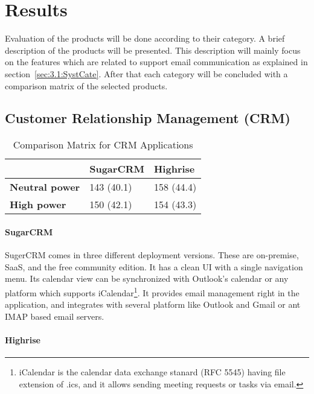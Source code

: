 \section{Results}
\label{sec:3.3:Resul}
Evaluation of the products will be done according to their category. A brief description of the products will be presented. This description will mainly focus on the features which are related to support email communication as explained in section~\ref{sec:3.1:SystCate}. After that each category will be concluded with a comparison matrix of the selected products.

\subsection{Customer Relationship Management (CRM)}
\label{subsec:3.3.1:Cust}

\begin{table}[!ht]
\begin{center}
	\caption[Comparison Matrix for CRM Applications]{Comparison Matrix for CRM Applications} \label{tab:comp_matr_crm}
    \begin{tabular}{ p{3cm} p{3cm}  p{3cm} }
	\hline
	& \textbf{SugarCRM} & \textbf{Highrise} \\ \hline
	\textbf{Neutral power} & 143 (40.1) & 158 (44.4) \\
	\textbf{High power} & 150 (42.1) & 154 (43.3) \\ \hline
    \end{tabular}
\end{center}
\end{table}

\paragraph{SugarCRM}
SugerCRM comes in three different deployment versions. These are on-premise, \ac{SaaS}, and the free community edition. It has a clean \ac{UI} with a single navigation menu. Its calendar view can be synchronized with Outlook's calendar or any platform which supports iCalendar\footnote{iCalendar is the calendar data exchange stanard (RFC 5545) having file extension of .ics, and it allows sending meeting requests or tasks via email.}. It provides email management right in the application, and integrates with several platform like Outlook and Gmail or ant \ac{IMAP} based email servers. 


\paragraph{Highrise}



